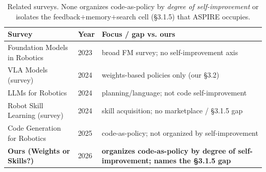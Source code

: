 \begin{table}[t]
\centering
\footnotesize
\renewcommand{\arraystretch}{1.2}
\begin{tabular}{@{}p{}p{}p{}@{}}
\toprule
\textbf{Survey} & \textbf{Year} & \textbf{Focus / gap vs. ours} \\
\midrule
Foundation Models in Robotics       & 2023 & broad FM survey; no self-improvement axis \\
VLA Models (survey)                 & 2024 & weights-based policies only (our \S3.2) \\
LLMs for Robotics                   & 2024 & planning/language; not code self-improvement \\
Robot Skill Learning (survey)       & 2024 & skill acquisition; no marketplace / \S3.1.5 gap \\
Code Generation for Robotics        & 2025 & code-as-policy; not organized by self-improvement \\
\textbf{Ours (Weights or Skills?)}  & 2026 & \textbf{organizes code-as-policy by degree of self-improvement; names the \S3.1.5 gap} \\
\bottomrule
\end{tabular}
\caption{Related surveys. None organizes code-as-policy by \emph{degree of self-improvement}
or isolates the feedback$+$memory$+$search cell (\S3.1.5) that ASPIRE occupies.}
\label{tab:surveys}
\end{table}

